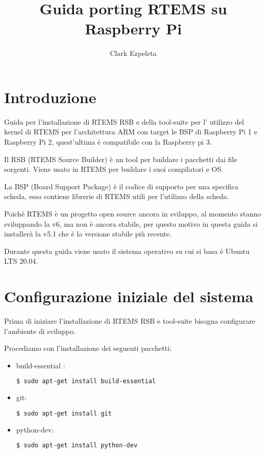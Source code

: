 \documentclass[10pt, a4paper]{article}
\title{Guida porting RTEMS su Raspberry Pi}
\author{Clark Ezpeleta}
\begin{document}
\maketitle
\newpage
\tableofcontents
\newpage
{}
\begin{flushleft}
\section{Introduzione}
Guida per l'installazione di RTEMS RSB e della tool-suite per l' utilizzo del kernel di RTEMS per l'architettura ARM con target le BSP di Raspberry Pi 1 e Raspberry Pi 2, quest'ultima è compatibile con la Raspberry pi 3.

Il RSB (RTEMS Source Builder) è un tool per buildare i pacchetti dai file sorgenti. Viene usato in RTEMS per buildare i suoi compilatori e OS.

La BSP (Board Support Package) è il codice di supporto per una specifica scheda, esso contiene librerie di RTEMS utili per l'utilizzo della scheda.

Poichè RTEMS è un progetto open source ancora in sviluppo, al momento stanno sviluppando la v6, ma non è ancora stabile, per questo motivo in questa guida si installerà la v5.1 che è la versione stabile più recente.

Durante questa guida viene usato il sistema operativo su cui si basa è Ubuntu LTS 20.04.


\newpage
\section{Configurazione iniziale del sistema}
Prima di iniziare l'installazione di RTEMS RSB e tool-suite bisogna configurare l'ambiente di sviluppo.

Procediamo con l'installazione dei seguenti pacchetti:
\begin{itemize}
\item  build-essential : 
\begin{lstlisting}[language=bash] 
$ sudo apt-get install build-essential
\end{lstlisting}
\item git:
\begin{lstlisting}[language=bash] 
$ sudo apt-get install git
\end{lstlisting}
\item python-dev:
\begin{lstlisting}[language=bash] 
 $ sudo apt-get install python-dev
 \end{lstlisting}
\end{itemize}


\end{flushleft}
\end{document}
